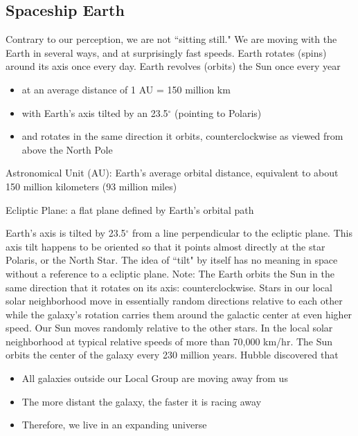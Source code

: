 \documentclass[12pt]{article}
\begin{document}
\subsection{Spaceship Earth} 
Contrary to our perception, we are not ``sitting still." We are moving with the Earth in several ways, and at surprisingly fast speeds. \newline 
Earth rotates (spins) around its axis once every day. 
Earth revolves (orbits) the Sun once every year \begin{itemize} 
\item at an average distance of 1 AU = 150 million km \item with Earth's axis tilted by an 23.5$^\circ$ (pointing to Polaris) \item and rotates in the same direction it orbits, counterclockwise as viewed from above the North Pole \end{itemize} 
\begin{definition} Astronomical Unit (AU): Earth's average orbital distance, equivalent  to about 150 million kilometers (93 million miles) \end{definition} 
\begin{definition} Ecliptic Plane: a flat plane defined by Earth's orbital path \end{definition} 
Earth's axis is tilted by 23.5$^\circ$ from a line perpendicular to the ecliptic plane. This axis tilt happens to be oriented so that it points almost directly at the star Polaris, or the North Star. The idea of ``tilt" by itself has no meaning in space without a reference to a ecliptic plane. \newline
Note: The Earth orbits the Sun in the same direction that it rotates on its axis: counterclockwise. \newline 
Stars in our local solar neighborhood move in essentially random directions relative to each other while the galaxy's rotation carries them around the galactic center at even higher speed. Our Sun moves randomly relative to the other stars. In the local solar neighborhood at typical relative speeds of more than 70,000 km/hr. The Sun orbits the center of the galaxy every 230 million years. \newline
Hubble discovered that \begin{itemize} 
\item All galaxies outside our Local Group are moving away from us 
\item The more distant the galaxy, the faster it is racing away 
\item Therefore, we live in an expanding universe \end{itemize} 
\end{document}
